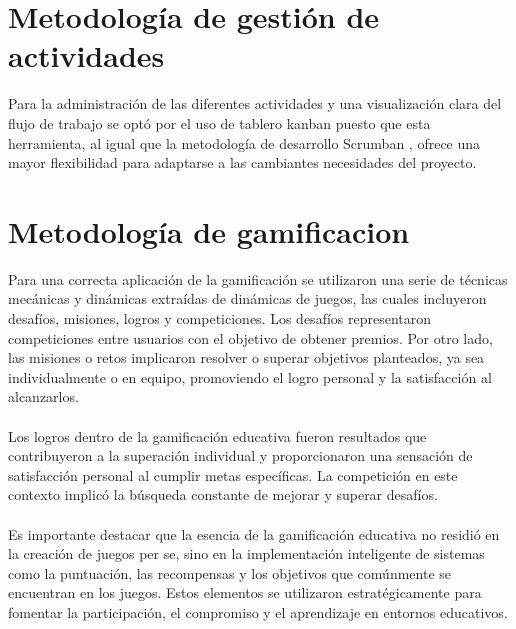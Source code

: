 \section{Metodología de gestión de actividades}
Para la administración de las diferentes actividades y una visualización clara del flujo de trabajo se optó por el uso de tablero kanban puesto que esta herramienta, al igual que la metodología de desarrollo Scrumban , ofrece una mayor flexibilidad para adaptarse a las cambiantes necesidades del proyecto.

\section{Metodología de gamificacion}
Para una correcta aplicación de la gamificación se utilizaron una serie de técnicas mecánicas y dinámicas extraídas de dinámicas de juegos, las cuales incluyeron desafíos, misiones, logros y competiciones. Los desafíos representaron competiciones entre usuarios con el objetivo de obtener premios. Por otro lado, las misiones o retos implicaron resolver o superar objetivos planteados, ya sea individualmente o en equipo, promoviendo el logro personal y la satisfacción al alcanzarlos.
\\ \\
Los logros dentro de la gamificación educativa fueron resultados que contribuyeron a la superación individual y proporcionaron una sensación de satisfacción personal al cumplir metas específicas. La competición en este contexto implicó la búsqueda constante de mejorar y superar desafíos.
\\ \\
Es importante destacar que la esencia de la gamificación educativa no residió en la creación de juegos per se, sino en la implementación inteligente de sistemas como la puntuación, las recompensas y los objetivos que comúnmente se encuentran en los juegos. Estos elementos se utilizaron estratégicamente para fomentar la participación, el compromiso y el aprendizaje en entornos educativos.
